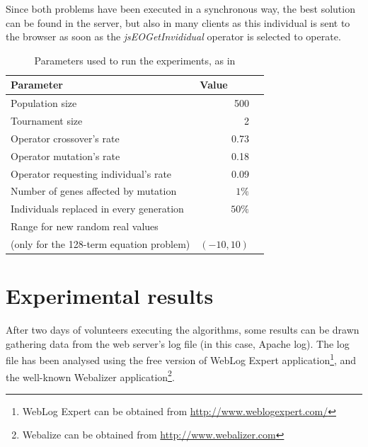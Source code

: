 \documentclass[runningheads,a4paper]{llncs}
\begin{document}
	
Since both problems have been executed in a synchronous way, the best solution can be found in the server, but also in many clients as this individual is sent to the browser as soon as the \textit{jsEOGetInvididual} operator is selected to operate.



\begin{table}
\caption{Parameters used to run the experiments, as in{\cite{agajaj}}}
\begin{center}
\begin{tabular}{l@{\quad}rl}
\hline
\multicolumn{1}{l}{\rule{0pt}{12pt}
                   Parameter}&\multicolumn{2}{l}{Value}\\[2pt]
\hline\rule{0pt}{12pt}
Population size & 500 & \\
Tournament size & 2 & \\
Operator crossover's rate & 0.73 & \\
Operator mutation's rate & 0.18 & \\
Operator requesting individual's rate & 0.09 & \\
Number of genes affected by mutation & $1\%$ &\\
Individuals replaced in every generation & $50\%$ & \\
Range for new random real values && \\
(only for the 128-term equation problem) & $(-10,10)$ & \\[2pt]
\hline

\end{tabular}
\label{tb:params}
\end{center}
\end{table}

  	




\section{Experimental results}
\label{sec:exp}

After two days of volunteers executing the algorithms, some results can be drawn gathering data from the web server's log file (in this case, Apache log). The log file has been analysed using the free version of WebLog Expert application\footnote{WebLog Expert can be obtained from \url{http://www.weblogexpert.com/}}, and the well-known Webalizer application\footnote{Webalize can be obtained from \url{http://www.webalizer.com}}.
\end{document}
